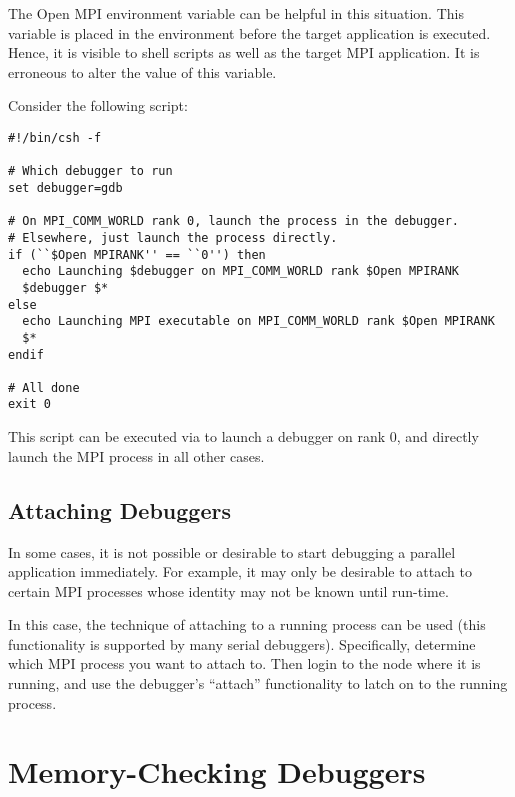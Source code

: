 The Open MPI environment variable  can be
helpful in this situation.  This variable is placed in the environment
before the target application is executed.  Hence, it is visible to
shell scripts as well as the target MPI application.  It is erroneous
to alter the value of this variable.

Consider the following script:

\lstset{style=ompi-shell}
\begin{lstlisting}
#!/bin/csh -f

# Which debugger to run
set debugger=gdb

# On MPI_COMM_WORLD rank 0, launch the process in the debugger.
# Elsewhere, just launch the process directly.
if (``$Open MPIRANK'' == ``0'') then
  echo Launching $debugger on MPI_COMM_WORLD rank $Open MPIRANK
  $debugger $*
else
  echo Launching MPI executable on MPI_COMM_WORLD rank $Open MPIRANK
  $*
endif

# All done
exit 0
\end{lstlisting}

This script can be executed via  to launch a debugger on
 rank 0, and directly launch the MPI
process in all other cases.


\subsection{Attaching Debuggers}

In some cases, it is not possible or desirable to start debugging a
parallel application immediately.  For example, it may only be
desirable to attach to certain MPI processes whose identity may not be
known until run-time.

In this case, the technique of attaching to a running process can be
used (this functionality is supported by many serial debuggers).
Specifically, determine which MPI process you want to attach to.  Then
login to the node where it is running, and use the debugger's
``attach'' functionality to latch on to the running process.


\section{Memory-Checking Debuggers}
\label{sec:debug-mem}

